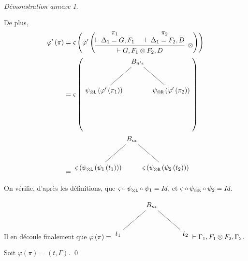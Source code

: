 \documentclass[11pt,a4paper]{article}
\theoremstyle{plain}
\theoremstyle{definition}
\theoremstyle{remark}
\newtheorem{demonstrationappendix}{Démonstration annexe}
\newcommand*{\tensor}{\otimes}
\newcommand*{\namedproofv}[2]{\hypo{#1}\infer[no rule]{1}{\vdash #2}}
\newcommand*{\tensorv}[1]{\infer{2}[\ensuremath{\tensor}]{\vdash #1}}
\newcommand*{\someperm}{\varsigma}
\newcommand*{\sequent}{\Gamma}
\newcommand*{\sequentbis}{\Delta}
\newcommand*{\Left}{\textnormal{\texttt{L}}}
\newcommand*{\Right}{\textnormal{\texttt{R}}}
\newcommand*{\encode}{\ensuremath{\varphi}}
\begin{document}
\begin{demonstrationappendix}
\begin{description}
        De plus, 
        \begin{equation*}
            \begin{split}
            \encode' \left( \pi \right) & = 
            \someperm \left( \encode' \left( 
            \begin{prooftree}
                \namedproofv{\pi_1}{\sequentbis_1 = G, F_1}
                \namedproofv{\pi_2}{\sequentbis_1 = F_2, D}
                \tensorv{G, F_1 \tensor F_2, D}
            \end{prooftree}
            \right) \right) \\
            & = \someperm \left(
            \begin{tikzpicture}%
            [level 1/.style={sibling distance=3.5cm}]
            \node {$B_{n' \epsilon}$}
                child {node {$\psi_{\tensor\Left} \left( \encode' \left(
                        \pi_1
                      \right) \right)$}}
                child {node {$\psi_{\tensor\Right} \left( \encode' \left(
                        \pi_2
                      \right) \right)$}
            };
            \end{tikzpicture} 
            \right) \\
            & = \begin{tikzpicture}%
            [level 1/.style={sibling distance=3.5cm}]
            \node {$B_{n \epsilon}$}
                child {node {$\someperm \left( \psi_{\tensor\Left} \left( \psi_1 \left(
                        t_1
                      \right) \right) \right)$}}
                child {node {$\someperm \left( \psi_{\tensor\Right} \left( \psi_2 \left(
                        t_2
                      \right) \right) \right)$}
            };
            \end{tikzpicture} 
            \end{split}
        \end{equation*}
    
        On vérifie, d'après les définitions, que $\someperm \circ \psi_{\tensor\Left} \circ \psi_1 = \textit{Id}$, et $\someperm \circ \psi_{\tensor\Right} \circ \psi_2 = \textit{Id}$.
    
        Il en découle finalement que $\encode \left( \pi \right) = 
        \begin{tikzpicture}%
            [level 1/.style={sibling distance=3.5cm}]
            \node {$B_{n \epsilon}$}
                child {node {$t_1$}}
                child {node {$t_2$}
            };
            \end{tikzpicture} 
            \vdash \sequent_1, F_1 \tensor F_2, \sequent_2$. 
            
            Soit $\encode \left( \pi \right) = \left( t, \sequent \right)$.
\qed
    \end{description}
\end{demonstrationappendix}
\end{document}
